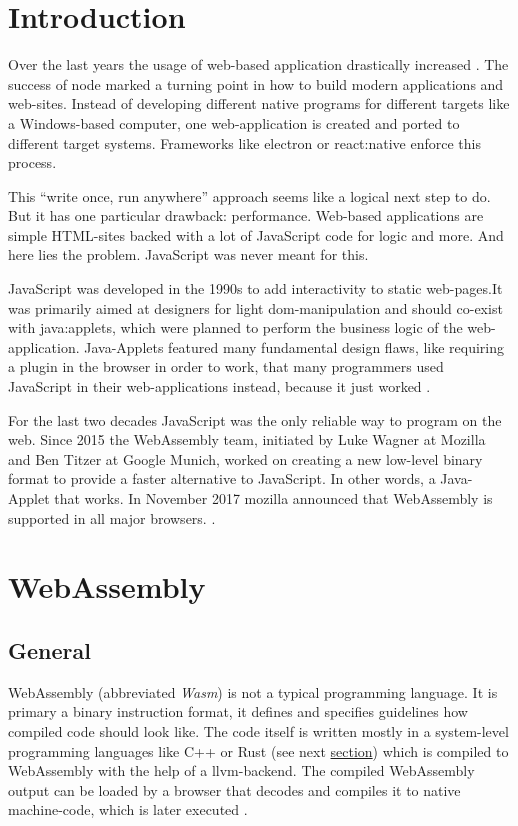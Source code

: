 
\section{Introduction}
Over the last years the usage of web-based application drastically increased \cite[cf.][]{stackoverflow:survey}. The success of \gls{node} marked a turning point in how to build modern applications and web-sites. Instead of developing different native programs for different targets like a Windows-based computer, one web-application is created and ported to different target systems. Frameworks like \gls{electron} or \gls{react:native} enforce this process.

This ``write once, run anywhere'' approach seems like a logical next step to do. But it has one particular drawback: performance. Web-based applications are simple HTML-sites backed with a lot of JavaScript code for logic and more. And here lies the problem. JavaScript was never meant for this.

JavaScript was developed in the 1990s to add interactivity to static web-pages.It was primarily aimed at designers for light \gls{dom}-manipulation and should co-exist with \gls{java:applet}s, which were planned to perform the business logic of the web-application. Java-Applets featured many fundamental design flaws, like requiring a plugin in the browser in order to work, that many programmers used JavaScript in their web-applications instead, because it just worked \cite{js:history, wasm:explanation, javaapplet:history}.

For the last two decades JavaScript was the only reliable way to program on the web. Since 2015 the WebAssembly team, initiated by Luke Wagner at Mozilla and Ben Titzer at Google Munich, worked on creating a new low-level binary format to provide a faster alternative to JavaScript. In other words, a Java-Applet that works. In November 2017 \gls{mozilla} announced that WebAssembly is supported in all major browsers. \cite{wasm:revolution, wasm:support}.  

\section{WebAssembly}

\subsection{General}
WebAssembly (abbreviated \textit{Wasm}) is not a typical programming language. It is primary a binary instruction format, it defines and specifies guidelines how compiled code should look like. The code itself is written mostly in a system-level programming languages like C++ or Rust (see next \hyperref[sec:rust]{section}) which is compiled to WebAssembly with the help of a \gls{llvm}-backend. The compiled WebAssembly output can be loaded by a browser that decodes and compiles it to native machine-code, which is later executed \cite{wasm:basics, wasm:howandwhy}.

